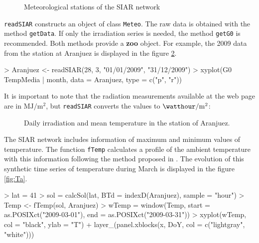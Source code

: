 \documentclass[a4paper]{article}
\renewenvironment{Schunk}{\vspace{\topsep}}{\vspace{\topsep}}
\newcommand{\code}[1]{{\texttt{#1}}}
\newcommand{\pkg}[1]{{\textbf{#1}}}
\begin{document}
\begin{figure}
  \centering
  \caption{Meteorological stations of the SIAR network}
\label{fig:siar}
\end{figure}

\code{readSIAR} constructs an object of class \code{Meteo}. The
raw data is obtained with the method \code{getData}.  If only the
irradiation series is needed, the method \code{getG0} is
recommended. Both methods provide a \pkg{zoo} object. 
For example, the 2009 data from the station at Aranjuez is displayed
in the figure \ref{fig:Aranjuez}.  

\begin{Schunk}
\begin{Sinput}
> Aranjuez <- readSIAR(28, 3, "01/01/2009", "31/12/2009")
> xyplot(G0 ~ TempMedia | month, data = Aranjuez, type = c("p", "r"))
\end{Sinput}
\end{Schunk}

It is important to note that the radiation
measurements available at the web page are in
$\si{\mega\joule\per\meter\squared}$, but \code{readSIAR} converts
the values to $\si{\watthour\per\meter\squared}$:


\begin{figure}
  \centering
  \caption{Daily irradiation and mean temperature in the station of Aranjuez.}
  \label{fig:Aranjuez}
\end{figure}

The SIAR network includes information of maximum and minimum values of
temperature.  The function \code{fTemp} calculates a profile of the
ambient temperature with this information following the method
proposed in \cite{Huld.Suri.ea2006}.  The evolution of this synthetic
time series of temperature during March is displayed in the figure \ref{fig:Ta}.

\begin{Schunk}
\begin{Sinput}
> lat = 41
> sol = calcSol(lat, BTd = indexD(Aranjuez), sample = "hour")
> Temp <- fTemp(sol, Aranjuez)
> wTemp = window(Temp, start = as.POSIXct("2009-03-01"), 
      end = as.POSIXct("2009-03-31"))
> xyplot(wTemp, col = "black", ylab = "T") + 
      layer_(panel.xblocks(x, DoY, col = c("lightgray", "white")))
\end{Sinput}
\end{Schunk}
\end{document}
